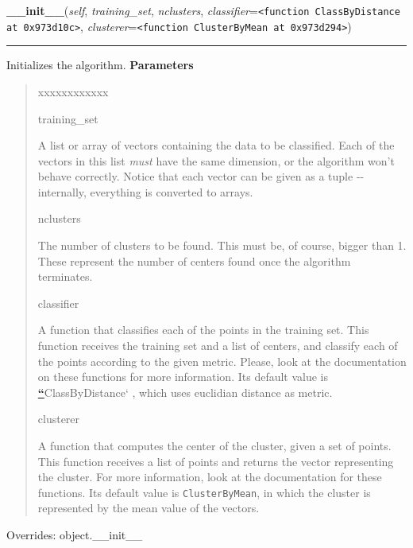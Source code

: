 \hspace{.8\funcindent}\begin{boxedminipage}{\funcwidth}

    \raggedright \textbf{\_\_init\_\_}(\textit{self}, \textit{training\_set}, \textit{nclusters}, \textit{classifier}={\tt {\textless}function ClassByDistance at 0x973d10c{\textgreater}}, \textit{clusterer}={\tt {\textless}function ClusterByMean at 0x973d294{\textgreater}})

    \vspace{-1.5ex}

    \rule{\textwidth}{0.5\fboxrule}
\setlength{\parskip}{2ex}

Initializes the algorithm.
\setlength{\parskip}{1ex}
      \textbf{Parameters}
      \vspace{-1ex}

      \begin{quote}
        \begin{Ventry}{xxxxxxxxxxxx}

          \item[training\_set]


A list or array of vectors containing the data to be classified.
Each of the vectors in this list \emph{must} have the same dimension, or
the algorithm won't behave correctly. Notice that each vector can be
given as a tuple -{}- internally, everything is converted to arrays.
          \item[nclusters]


The number of clusters to be found. This must be, of course, bigger
than 1. These represent the number of centers found once the
algorithm terminates.
          \item[classifier]


A function that classifies each of the points in the training set.
This function receives the training set and a list of centers, and
classify each of the points according to the given metric. Please,
look at the documentation on these functions for more information.
Its default value is %
\hyperlink{id1}{\textbf{\color{red}``}}ClassByDistance` , which uses euclidian
distance as metric.
          \item[clusterer]


A function that computes the center of the cluster, given a set of
points. This function receives a list of points and returns the
vector representing the cluster. For more information, look at the
documentation for these functions. Its default value is
\texttt{ClusterByMean}, in which the cluster is represented by the mean
value of the vectors.
        \end{Ventry}

      \end{quote}

      Overrides: object.\_\_init\_\_

    \end{boxedminipage}

